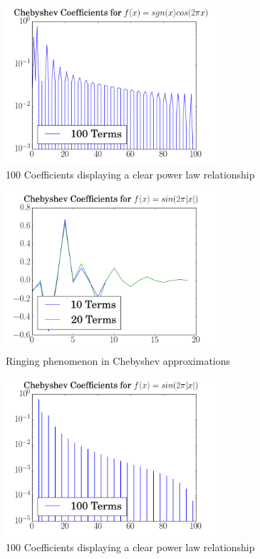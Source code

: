 \documentclass[12pt]{article}
\begin{document}
  \begin{figure}[h!]
    \centering
    \includegraphics[width=0.7\textwidth]{Problem6iib.png}
    \caption{100 Coefficients displaying a clear power law relationship}
  \end{figure}
 
   
  \begin{figure}[h!]
    \centering
    \includegraphics[width=0.7\textwidth]{Problem6iiia.png}
    \caption{Ringing phenomenon in Chebyshev approximations}
  \end{figure}

  \begin{figure}[h!]
    \centering
    \includegraphics[width=0.7\textwidth]{Problem6iiib.png}
    \caption{100 Coefficients displaying a clear power law relationship}
  \end{figure}
\end{document}
